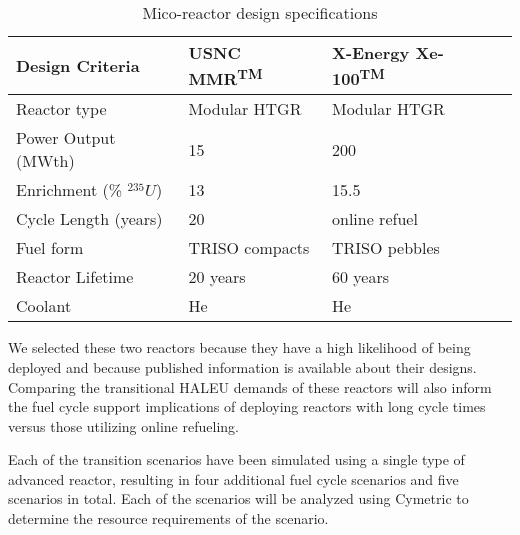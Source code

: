 \begin{table}[ht]
    \caption{Mico-reactor design specifications}
    \label{tab:reactor_summary}
    \begin{tabular}{l p{2.5cm}p{2.25cm}p{2.4cm}}
        \hline
        Design Criteria & \gls{USNC} \gls{MMR}\textsuperscript{TM} & 
            X-Energy Xe-100\textsuperscript{TM} \\\hline
        Reactor type & Modular HTGR & Modular HTGR \\
        Power Output (MWth) & 15 & 200 \\
        Enrichment (\% $^{235}U$) & 13 & 15.5 \\
        Cycle Length (years) & 20 & online refuel\\
        Fuel form & \gls{TRISO} compacts & \gls{TRISO} pebbles\\
        Reactor Lifetime & 20 years & 60 years \\
        Coolant & He & He \\
        \hline
    \end{tabular}
\end{table}
    
We selected these two reactors because they have a high 
likelihood of being deployed and because published information is 
available about their designs. Comparing the transitional \gls{HALEU} 
demands of these reactors will also inform the fuel cycle support 
implications of deploying reactors with long cycle 
times versus those utilizing online refueling. 

Each of the transition scenarios have been simulated using a single type of 
advanced reactor, resulting in four additional fuel cycle scenarios and five 
scenarios in total. Each of the scenarios will be analyzed using Cymetric
\cite{scopatz_cymetric_2015} to determine the resource requirements of the 
scenario. 

